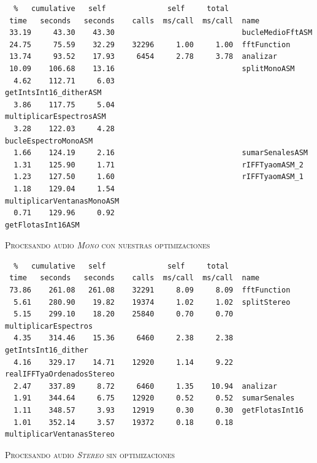 \documentclass[%
    compressed,
    titlepage,
    narroweqnarray,
    inline,
    twoside,
    ]{ieee}
\begin{document}
{\small
\begin{lstlisting}
  %   cumulative   self              self     total
 time   seconds   seconds    calls  ms/call  ms/call  name
 33.19     43.30    43.30                             bucleMedioFftASM
 24.75     75.59    32.29    32296     1.00     1.00  fftFunction
 13.74     93.52    17.93     6454     2.78     3.78  analizar
 10.09    106.68    13.16                             splitMonoASM
  4.62    112.71     6.03                             getIntsInt16_ditherASM
  3.86    117.75     5.04                             multiplicarEspectrosASM
  3.28    122.03     4.28                             bucleEspectroMonoASM
  1.66    124.19     2.16                             sumarSenalesASM
  1.31    125.90     1.71                             rIFFTyaomASM_2
  1.23    127.50     1.60                             rIFFTyaomASM_1
  1.18    129.04     1.54                             multiplicarVentanasMonoASM
  0.71    129.96     0.92                             getFlotasInt16ASM
\end{lstlisting}
}
\begin{center} \textsc{Procesando audio \textit{Mono} con nuestras optimizaciones} \end{center}

{\small
\begin{lstlisting}
  %   cumulative   self              self     total
 time   seconds   seconds    calls  ms/call  ms/call  name
 73.86    261.08   261.08    32291     8.09     8.09  fftFunction
  5.61    280.90    19.82    19374     1.02     1.02  splitStereo
  5.15    299.10    18.20    25840     0.70     0.70  multiplicarEspectros
  4.35    314.46    15.36     6460     2.38     2.38  getIntsInt16_dither
  4.16    329.17    14.71    12920     1.14     9.22  realIFFTyaOrdenadosStereo
  2.47    337.89     8.72     6460     1.35    10.94  analizar
  1.91    344.64     6.75    12920     0.52     0.52  sumarSenales
  1.11    348.57     3.93    12919     0.30     0.30  getFlotasInt16
  1.01    352.14     3.57    19372     0.18     0.18  multiplicarVentanasStereo
\end{lstlisting}
}
\begin{center} \textsc{Procesando audio \textit{Stereo} sin optimizaciones} \end{center}
\end{document}
